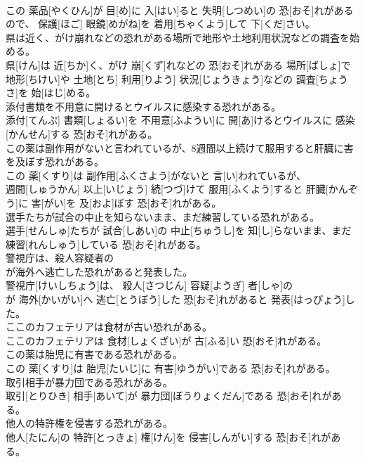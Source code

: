 \documentclass[8pt]{extreport}
\begin{document}
\begin{CJK}{UTF8}{min}
\\	この 薬品[やくひん]が 目[め]に 入[はい]ると 失明[しつめい]の 恐[おそ]れがあるので、 保護[ほご] 眼鏡[めがね]を 着用[ちゃくよう]して 下[くだ]さい。
\\	県は近く、がけ崩れなどの恐れがある場所で地形や土地利用状況などの調査を始める。	
\\	県[けん]は 近[ちか]く、がけ 崩[くず]れなどの 恐[おそ]れがある 場所[ばしょ]で 地形[ちけい]や 土地[とち] 利用[りよう] 状況[じょうきょう]などの 調査[ちょうさ]を 始[はじ]める。
\\	添付書類を不用意に開けるとウイルスに感染する恐れがある。	
\\	添付[てんぷ] 書類[しょるい]を 不用意[ふようい]に 開[あ]けるとウイルスに 感染[かんせん]する 恐[おそ]れがある。
\\	この薬は副作用がないと言われているが、8週間以上続けて服用すると肝臓に害を及ぼす恐れがある。	
\\	この 薬[くすり]は 副作用[ふくさよう]がないと 言[い]われているが、 
\\	週間[しゅうかん] 以上[いじょう] 続[つづ]けて 服用[ふくよう]すると 肝臓[かんぞう]に 害[がい]を 及[およ]ぼす 恐[おそ]れがある。
\\	選手たちが試合の中止を知らないまま、まだ練習している恐れがある。	
\\	選手[せんしゅ]たちが 試合[しあい]の 中止[ちゅうし]を 知[し]らないまま、まだ 練習[れんしゅう]している 恐[おそ]れがある。
\\	警視庁は、殺人容疑者の
\\	が海外へ逃亡した恐れがあると発表した。	
\\	警視庁[けいしちょう]は、 殺人[さつじん] 容疑[ようぎ] 者[しゃ]の 
\\	が 海外[かいがい]へ 逃亡[とうぼう]した 恐[おそ]れがあると 発表[はっぴょう]した。
\\	ここのカフェテリアは食材が古い恐れがある。	
\\	ここのカフェテリアは 食材[しょくざい]が 古[ふる]い 恐[おそ]れがある。
\\	この薬は胎児に有害である恐れがある。	
\\	この 薬[くすり]は 胎児[たいじ]に 有害[ゆうがい]である 恐[おそ]れがある。
\\	取引相手が暴力団である恐れがある。	
\\	取引[とりひき] 相手[あいて]が 暴力団[ぼうりょくだん]である 恐[おそ]れがある。
\\	他人の特許権を侵害する恐れがある。	
\\	他人[たにん]の 特許[とっきょ] 権[けん]を 侵害[しんがい]する 恐[おそ]れがある。

\end{CJK}
\end{document}

